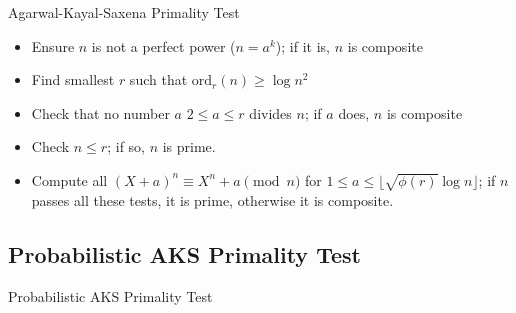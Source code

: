 \documentclass[pdf]{beamer}
\begin{document}
\begin{frame}{Agarwal-Kayal-Saxena Primality Test}
    \begin{outline}
        \begin{itemize}
                \pause
            \item{Ensure $n$ is not a perfect power ($n = a^k$); if it is, $n$ is composite}
                \pause
            \item{Find smallest $r$ such that $\textrm{ord}_r(n) \ge \log{n}^2$}
                \pause
            \item{Check that no number $a$ $2 \leq a \leq r$ divides $n$; if $a$ does, $n$ is composite}
                \pause
            \item{Check $n \leq r$; if so, $n$ is prime.}
                \pause
            \item{Compute all $(X + a)^n \equiv X^n + a \pmod{n}$ for $1 \leq a \leq \lfloor \sqrt{\phi(r)} \log{n} \rfloor$; if $n$ passes all these tests, it is prime, otherwise it is composite.}
        \end{itemize}
    \end{outline}
\end{frame}

\subsection{Probabilistic AKS Primality Test}
\begin{frame}{Probabilistic AKS Primality Test}
    \begin{outline}
        \pause
    \end{outline}
\end{frame}
\end{document}
